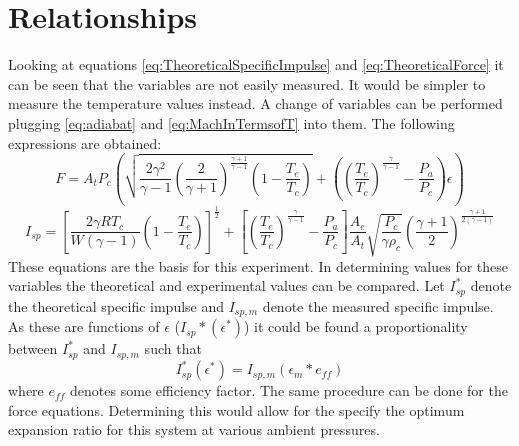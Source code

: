 \section{Relationships}\label{sec:Relationships}
Looking at equations \ref{eq:TheoreticalSpecificImpulse} and \ref{eq:TheoreticalForce} it can be seen that the variables are not easily measured. It would be simpler to measure the temperature values instead. A change of variables can be performed plugging \ref{eq:adiabat} and \ref{eq:MachInTermsofT} into them. The following expressions are obtained:
\begin{equation}\label{eq:RelevantNozzleForce}
F = A_t P_c \left(\sqrt{\frac{2\gamma^2}{\gamma-1}\left(\frac{2}{\gamma+1}\right)^{\frac{\gamma+1}{\gamma-1}}\left(1-\frac{T_e}{T_c}\right)}+\left(\left(\frac{T_e}{T_c}\right)^{\frac{\gamma}{\gamma-1}}-\frac{P_a}{P_c}\right)\epsilon\right)
\end{equation}
\begin{equation}\label{eq:RelevantIsp}
I_{sp}=\left[\frac{2\gamma R T_c}{W(\gamma-1)}\left(1-\frac{T_e}{T_c}\right)\right]^{\frac{1}{2}}+\left[\left(\frac{T_e}{T_c}\right)^{\frac{\gamma}{\gamma-1}}-\frac{P_a}{P_c}\right]\frac{A_e}{A_t}\sqrt{\frac{P_c}{\gamma\rho_c}}\left(\frac{\gamma+1}{2}\right)^{\frac{\gamma+1}{2(\gamma-1)}}
\end{equation}
These equations are the basis for this experiment. In determining values for these variables the theoretical and experimental values can be compared. Let $I_{sp}^*$ denote the theoretical specific impulse and $I_{sp,m}$ denote the measured specific impulse. As these are functions of $\epsilon$ ($I_{sp}*(\epsilon^*)$) it could be found a proportionality between $I_{sp}^*$ and $I_{sp,m}$ such that
\begin{equation}
I_{sp}^*(\epsilon^*)=I_{sp,m}(\epsilon_m*e_{ff})
\end{equation}%
%
%
%
%
%
where $e_{ff}$ denotes some efficiency factor. The same procedure can be done for the force equations. Determining this would allow for the specify the optimum expansion ratio for this system at various ambient pressures.